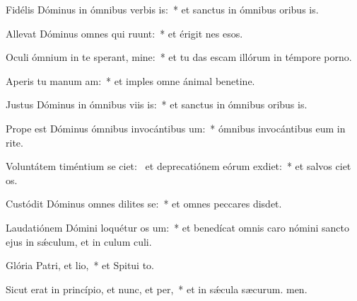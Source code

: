 \item Fidélis Dóminus in ómnibus verbis is:~* et sanctus in ómnibus oribus is.
\item Allevat Dóminus omnes qui ruunt:~* et érigit nes esos.
\item Oculi ómnium in te sperant, mine:~* et tu das escam illórum in témpore porno.
\item Aperis tu manum am:~* et imples omne ánimal benetine.
\item Justus Dóminus in ómnibus viis is:~* et sanctus in ómnibus oribus is.
\item Prope est Dóminus ómnibus invocántibus um:~* ómnibus invocántibus eum in rite.
\item Voluntátem timéntium se ciet:~\pscross{} et deprecatiónem eórum exdiet:~* et salvos ciet os.
\item Custódit Dóminus omnes dilites se:~* et omnes peccares disdet.
\item Laudatiónem Dómini loquétur os um:~* et benedícat omnis caro nómini sancto ejus in sǽculum, et in culum culi.
\item Glória Patri, et lio,~* et Spitui to.
\item Sicut erat in princípio, et nunc, et per,~* et in sǽcula sæcurum. men.
